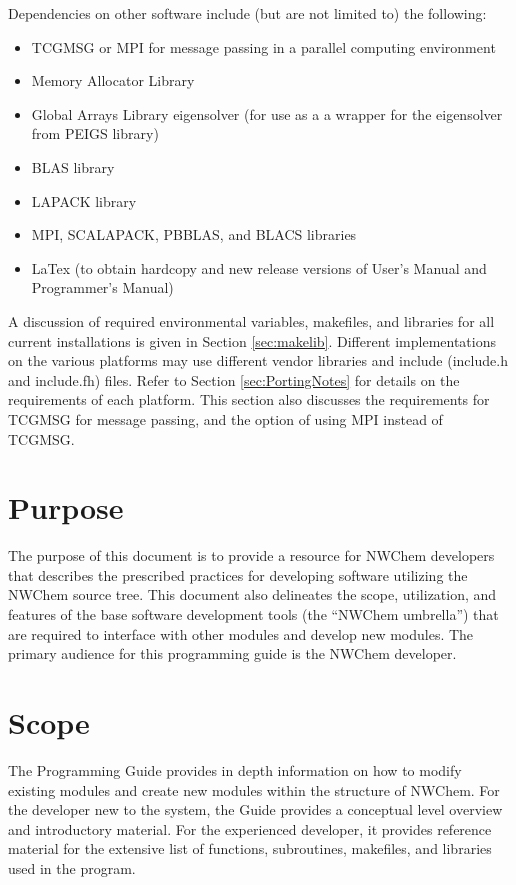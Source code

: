 Dependencies on other software include (but are not limited to) the following:
\begin{itemize}
\item TCGMSG or MPI for message passing in a parallel computing environment

\item Memory Allocator Library

\item Global Arrays Library eigensolver (for use as a a wrapper for 
the eigensolver from PEIGS library)

\item BLAS library

\item LAPACK library

\item MPI, SCALAPACK, PBBLAS, and BLACS libraries
\item LaTex (to obtain hardcopy and new release versions of
User's Manual and Programmer's Manual)
\end{itemize}

A discussion of required environmental variables, makefiles, and 
libraries for all current installations is given in Section \ref{sec:makelib}.  
Different implementations on the various platforms may use different vendor 
libraries and include (include.h and include.fh) files.  Refer to Section 
\ref{sec:PortingNotes} for details on the requirements of each platform.  
This section also discusses the requirements for TCGMSG for message passing, 
and the option of using MPI instead of TCGMSG.


\section*{Purpose}

The purpose of this document is to provide a resource for NWChem developers 
that describes the prescribed practices for developing software utilizing 
the NWChem source tree.  This document also delineates the scope, utilization, 
and features of the base software development tools (the ``NWChem umbrella'') 
that are required to interface with other modules and develop new modules.  
The primary audience for this programming guide is the NWChem developer.

\section*{Scope}

The Programming Guide provides in depth information on how to modify existing 
modules and create new modules within the structure of NWChem.  For the 
developer new to the system, the Guide provides a conceptual level overview 
and introductory material.  For the experienced developer, it provides reference 
material for the extensive list of functions, subroutines, makefiles, 
and libraries used in the program.

